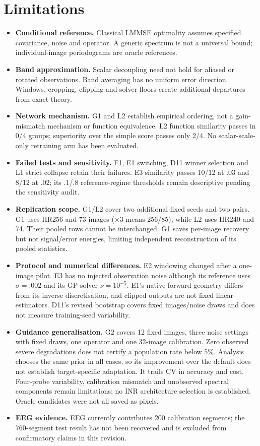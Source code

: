 \section{Limitations}\label{sec:limits}
\begin{itemize}
\item \textbf{Conditional reference.} Classical LMMSE optimality assumes
specified covariance, noise and operator. A generic spectrum is not a
universal bound; individual-image periodograms are oracle references.
\item \textbf{Band approximation.} Scalar decoupling need not hold for
aliased or rotated observations. Band averaging has no uniform error
direction. Windows, cropping, clipping and solver floors create additional
departures from exact theory.
\item \textbf{Network mechanism.} G1 and L2 establish empirical ordering,
not a gain-mismatch mechanism or function equivalence. L2 function
similarity passes in 0/4 groups; superiority over the simple score passes only
2/4. No scalar-scale-only retraining arm has been evaluated.
\item \textbf{Failed tests and sensitivity.} F1, E1 switching, D11 winner
selection and L1 strict collapse retain their failures. E3 similarity
passes 10/12 at .03 and 8/12 at .02; its .1/.8 reference-regime thresholds
remain descriptive pending the sensitivity audit.
\item \textbf{Replication scope.} G1/L2 cover two additional fixed seeds
and two pairs. G1 uses HR256 and 73 images ($\times3$ means 256/85), while
L2 uses HR240 and 74. Their pooled rows cannot be interchanged. G1 saves
per-image recovery but not signal/error energies, limiting independent
reconstruction of its pooled statistics.
\item \textbf{Protocol and numerical differences.} E2 windowing changed
after a one-image pilot. E3 has no injected observation noise although its
reference uses $\sigma=.002$ and its GP solver $\nu=10^{-5}$. E1's native
forward geometry differs from its inverse discretisation, and clipped
outputs are not fixed linear estimators. D11's revised bootstrap covers
fixed images/noise draws and does not measure training-seed variability.
\item \textbf{Guidance generalisation.} G2 covers 12 fixed images, three
noise settings with fixed draws, one operator and one 32-image calibration.
Zero observed severe degradations does not certify a population rate below
5\%. Analysis chooses the same prior in all cases, so its improvement
over the default does not establish target-specific adaptation. It trails
CV in accuracy and cost. Four-probe variability, calibration mismatch and
unobserved spectral components remain limitations; no INR architecture
selection is established. Oracle candidates were not all saved as pixels.
\item \textbf{EEG evidence.} EEG currently contributes 200 calibration segments;
the 760-segment test result has not been recovered and is excluded from
confirmatory claims in this revision.
\end{itemize}

